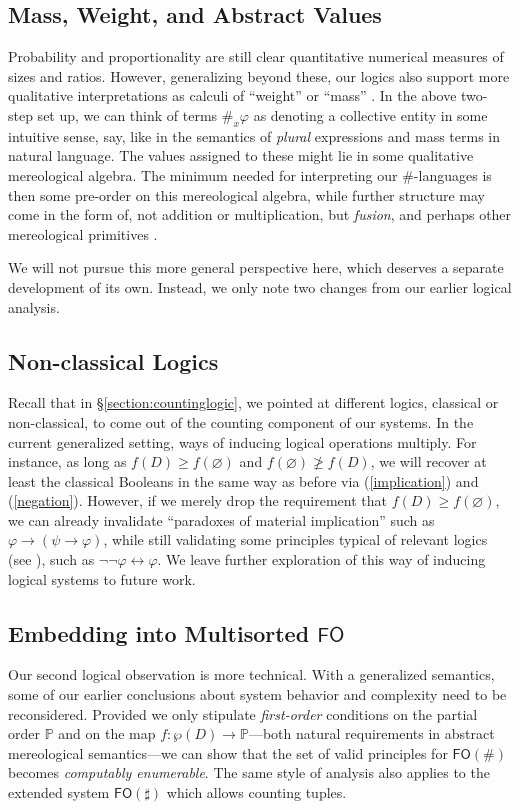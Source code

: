 \documentclass[12pt,oneside,reqno]{amsart}
\theoremstyle{definition}
\begin{document}
\subsection{Mass, Weight, and Abstract Values} \label{section:mass} Probability and proportionality are still clear quantitative numerical measures of sizes and ratios. However, generalizing beyond these, our logics also support more qualitative interpretations as calculi of ``weight'' or ``mass'' \citep{Link}. In the above two-step set up, we can think of terms $\#_x\varphi$ as denoting a collective entity in some intuitive sense, say, like in  the semantics of \emph{plural} expressions and mass terms in natural language. The values assigned to these might lie in some qualitative mereological algebra. The minimum needed for interpreting our $\#$-languages is then some pre-order on this mereological algebra, while further structure may come in the form of, not addition or multiplication, but \emph{fusion}, and perhaps other mereological primitives \citep{Lesniewski}. 

We will not pursue this more general perspective here, which deserves  a separate development of its own. Instead, we only note two changes from our earlier logical analysis.


\subsection{Non-classical Logics} Recall that in \S\ref{section:countinglogic}, we pointed at different logics, classical or non-classical, to come out of the counting component of our systems. In the current generalized setting, ways of inducing logical operations multiply. For instance, as long as $f(D) \geq f(\varnothing)$ and $f(\varnothing) \ngeq f(D)$, we will recover at least the classical Booleans in the same way as before via (\ref{implication}) and (\ref{negation}). However, if we merely drop the requirement that $f(D) \geq f(\varnothing)$, we can already  invalidate ``paradoxes of material implication'' such as $\varphi \rightarrow (\psi \rightarrow \varphi)$, while still validating some principles typical of relevant logics (see \citealt{Restall}), such as $\neg\neg \varphi \leftrightarrow \varphi$. We leave further exploration of this way of inducing logical systems to future work.

\subsection{Embedding into Multisorted $\mathsf{FO}$} Our second logical observation is more technical. With a generalized semantics, some of our earlier conclusions about system behavior and complexity need to be reconsidered. Provided we only stipulate \emph{first-order} conditions on the partial order $\mathbb{P}$ and on the map $f:\wp{(D)} \rightarrow \mathbb{P}$---both natural requirements in abstract mereological semantics---we can show that the set of valid principles for $\mathsf{FO}(\#)$ becomes \emph{computably enumerable}. The same style of  analysis also applies to the extended system $\mathsf{FO}(\sharp)$ which allows counting tuples. 
\end{document}
